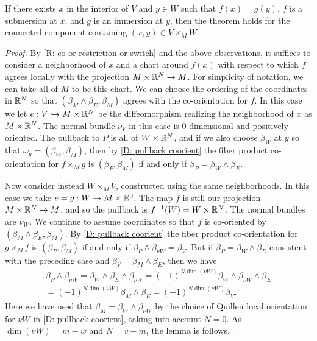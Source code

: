 \begin{lemma}\label{L: im/sub}
If there exists $x$ in the interior of $V$ and $y\in W$ such that  $f(x)=g(y)$, $f$ is a submersion at $x$, and $g$ is an immersion at $y$, then the theorem holds for the connected component containing $(x,y)\in V\times_MW$.
\end{lemma}
\begin{proof}
By \cref{R: co-or restriction or switch} and the above observations, it suffices to consider a neighborhood of $x$ and a chart around $f(x)$ with respect to which $f$ agrees locally with the projection $M\times \mathbb{R}^N\to M$. For simplicity of notation, we can take all of $M$ to be this chart. We can choose the ordering of the coordinates in $\mathbb{R}^N$ so that $(\beta_M\wedge \beta_E,\beta_M)$ agrees with the co-orientation for $f$. In this case we let $e:V\hookrightarrow M\times \mathbb{R}^N$ be the diffeomorphism realizing the neighborhood of $x$ as $M\times \mathbb{R}^N$. The normal bundle $\nu_V$ in this case is $0$-dimensional and positively oriented.
The pullback to $P$ is all of $W\times \mathbb{R}^N$, and if we also choose $\beta_W$ at $y$ so that $\omega_g=(\beta_W,\beta_M)$, then by \cref{D: pullback coorient} the fiber product  co-orientation for $f\times_Mg$ is $(\beta_P,\beta_M)$ if and only if $\beta_P=\beta_W\wedge \beta_E$.

Now consider instead $W\times_MV$, constructed using the same neighborhoods. In this case we take  $e=g:W\to M\times \mathbb{R}^0$. The map $f$ is still our projection $M\times \mathbb{R}^N\to M$, and so the pullback is $f^{-1}(W)=W\times \mathbb{R}^N$. The normal bundles are $\nu_W$. We continue to assume coordinates so that $f$ is co-oriented by $(\beta_M\wedge \beta_E, \beta_M)$.
By \cref{D: pullback coorient} the fiber product  co-orientation for $g\times_Mf$ is $(\beta_P,\beta_M)$ if and only if $\beta_P\wedge \beta_{\nu W} =\beta_V$. But if $\beta_P=\beta_W\wedge \beta_E$ consistent with the preceding case and $\beta_V=\beta_M\wedge \beta_E$, then we have
\begin{multline*}\beta_P\wedge \beta_{\nu W}=\beta_W\wedge \beta_E\wedge \beta_{\nu W}=(-1)^{N\dim(\nu W)}\beta_W\wedge \beta_{\nu W}\wedge \beta_E\\=(-1)^{N\dim(\nu W)}\beta_M\wedge \beta_E=(-1)^{N\dim(\nu W)}\beta_V.\end{multline*}
Here we have used that $\beta_M=\beta_W\wedge \beta_{\nu W}$ by the choice of Quillen local orientation for $\nu W$ in \cref{D: pullback coorient}, taking into account $N=0$.
As $\dim(\nu W)=m-w$ and $N=v-m$, the lemma is follows.
\end{proof}


